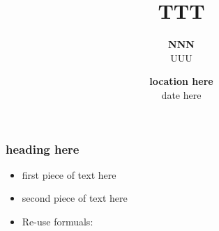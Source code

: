 \documentclass[11pt]{beamer}
\begin{document}
\title{TTT}

\author[NNN] %
{
{\bf NNN}\\
{\small UUU}\\[1ex]
}

\date{
{\bf location here}\\
{\small date here}
}


\begin{frame}
    \titlepage
    \note{~}
\end{frame}


\begin{frame}[t]
    \frametitle{heading here}
    \begin{itemize}
        \item<+-> first piece of text here
        \item<+-> second piece of text here
        \item<+-> Re-use formuals: 
    \end{itemize}
    \note{~}
\end{frame}


 {
    \begin{frame}
        \frametitle{}
    \end{frame}

}

\end{document}

